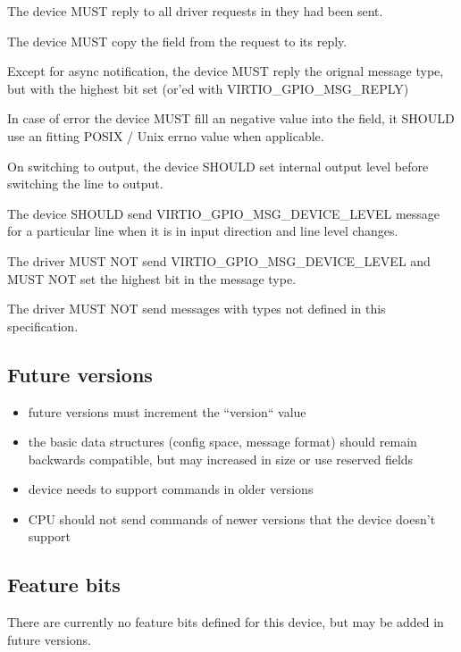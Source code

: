 
The device MUST reply to all driver requests in they had been sent.

The device MUST copy the  field from the request to its reply.

Except for async notification, the device MUST reply the orignal message type, but with the highest bit set
(or'ed with VIRTIO_GPIO_MSG_REPLY)

In case of error the device MUST fill an negative value into the  field, it SHOULD use
an fitting POSIX / Unix errno value when applicable.

On switching to output, the device SHOULD set internal output level before switching the line to output.

The device SHOULD send VIRTIO_GPIO_MSG_DEVICE_LEVEL message for a particular line when it is in input
direction and line level changes.


The driver MUST NOT send VIRTIO_GPIO_MSG_DEVICE_LEVEL and MUST NOT set the highest bit in the message type.

The driver MUST NOT send messages with types not defined in this specification.

\subsection{Future versions}\label{sec:Device Types / General Purpose IO / Future versions}

\begin{itemize}
    \item future versions must increment the ``version`` value
    \item the basic data structures (config space, message format) should remain
          backwards compatible, but may increased in size or use reserved fields
    \item device needs to support commands in older versions
    \item CPU should not send commands of newer versions that the device doesn't support
\end{itemize}

\subsection{Feature bits}\label{sec:Device Types / General Purpose IO / Feature bits}

There are currently no feature bits defined for this device, but may be added in future versions.
